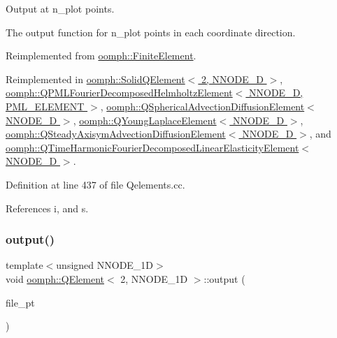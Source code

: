 Output at n\+\_\+plot points. 

The output function for n\+\_\+plot points in each coordinate direction. 

Reimplemented from \hyperlink{classoomph_1_1FiniteElement_afa9d9b2670f999b43e6679c9dd28c457}{oomph\+::\+Finite\+Element}.



Reimplemented in \hyperlink{classoomph_1_1SolidQElement_3_012_00_01NNODE__1D_01_4_abf15749cc9224e1412d3f404e20b69e4}{oomph\+::\+Solid\+Q\+Element$<$ 2, N\+N\+O\+D\+E\+\_\+D $>$}, \hyperlink{classoomph_1_1QPMLFourierDecomposedHelmholtzElement_afc5cf87a0704c5a139abdbd2bdf56e85}{oomph\+::\+Q\+P\+M\+L\+Fourier\+Decomposed\+Helmholtz\+Element$<$ N\+N\+O\+D\+E\+\_\+D, P\+M\+L\+\_\+\+E\+L\+E\+M\+E\+N\+T $>$}, \hyperlink{classoomph_1_1QSphericalAdvectionDiffusionElement_abc3c98e85e168e66999ccae5a35e0987}{oomph\+::\+Q\+Spherical\+Advection\+Diffusion\+Element$<$ N\+N\+O\+D\+E\+\_\+D $>$}, \hyperlink{classoomph_1_1QYoungLaplaceElement_a4cbc12fd3e2e37de4985d00f6eed5a14}{oomph\+::\+Q\+Young\+Laplace\+Element$<$ N\+N\+O\+D\+E\+\_\+D $>$}, \hyperlink{classoomph_1_1QSteadyAxisymAdvectionDiffusionElement_a5dd4db916c9c81fd0f72631a2a16c915}{oomph\+::\+Q\+Steady\+Axisym\+Advection\+Diffusion\+Element$<$ N\+N\+O\+D\+E\+\_\+D $>$}, and \hyperlink{classoomph_1_1QTimeHarmonicFourierDecomposedLinearElasticityElement_a42122255353025f62a4ff73fc35db587}{oomph\+::\+Q\+Time\+Harmonic\+Fourier\+Decomposed\+Linear\+Elasticity\+Element$<$ N\+N\+O\+D\+E\+\_\+D $>$}.



Definition at line 437 of file Qelements.\+cc.



References i, and s.

\mbox{\label{classoomph_1_1QElement_3_012_00_01NNODE__1D_01_4_a08e9ce84ba8787b25935f18c00996a5d}} 
\subsubsection{\texorpdfstring{output()}{output()}\hspace{0.1cm}{\footnotesize\ttfamily [3/4]}}
{\footnotesize\ttfamily template$<$unsigned N\+N\+O\+D\+E\+\_\+1D$>$ \\
void \hyperlink{classoomph_1_1QElement}{oomph\+::\+Q\+Element}$<$ 2, N\+N\+O\+D\+E\+\_\+1D $>$\+::output (\begin{DoxyParamCaption}\item[{F\+I\+LE $\ast$}]{file\+\_\+pt }\end{DoxyParamCaption})\hspace{0.3cm}{\ttfamily [virtual]}}



